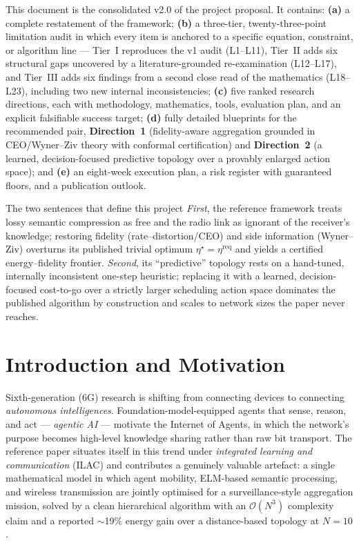 \documentclass[11pt,a4paper]{article}
\newcommand{\Dir}[1]{\textcolor{accent}{\textbf{Direction~#1}}}
\begin{document}
This document is the consolidated v2.0 of the project proposal. It contains: \textbf{(a)} a complete restatement of the framework; \textbf{(b)} a three-tier, twenty-three-point limitation audit in which every item is anchored to a specific equation, constraint, or algorithm line --- Tier~I reproduces the v1 audit (L1--L11), Tier~II adds six structural gaps uncovered by a literature-grounded re-examination (L12--L17), and Tier~III adds six findings from a second close read of the mathematics (L18--L23), including two new internal inconsistencies; \textbf{(c)} five ranked research directions, each with methodology, mathematics, tools, evaluation plan, and an explicit falsifiable success target; \textbf{(d)} fully detailed blueprints for the recommended pair, \Dir{1} (fidelity-aware aggregation grounded in CEO/Wyner--Ziv theory with conformal certification) and \Dir{2} (a learned, decision-focused predictive topology over a provably enlarged action space); and \textbf{(e)} an eight-week execution plan, a risk register with guaranteed floors, and a publication outlook.

\begin{infobox}{The two sentences that define this project}
\emph{First}, the reference framework treats lossy semantic compression as free and the radio link as ignorant of the receiver's knowledge; restoring fidelity (rate--distortion/CEO) and side information (Wyner--Ziv) overturns its published trivial optimum $\eta^{\star}=\eta^{\mathrm{req}}$ and yields a certified energy--fidelity frontier. \emph{Second}, its ``predictive'' topology rests on a hand-tuned, internally inconsistent one-step heuristic; replacing it with a learned, decision-focused cost-to-go over a strictly larger scheduling action space dominates the published algorithm by construction and scales to network sizes the paper never reaches.
\end{infobox}

\clearpage
\tableofcontents
\clearpage

\section{Introduction and Motivation}

Sixth-generation (6G) research is shifting from connecting devices to connecting \emph{autonomous intelligences}. Foundation-model-equipped agents that sense, reason, and act --- \emph{agentic AI} --- motivate the Internet of Agents, in which the network's purpose becomes high-level knowledge sharing rather than raw bit transport. The reference paper situates itself in this trend under \emph{integrated learning and communication} (ILAC) and contributes a genuinely valuable artefact: a single mathematical model in which agent mobility, ELM-based semantic processing, and wireless transmission are jointly optimised for a surveillance-style aggregation mission, solved by a clean hierarchical algorithm with an $\mathcal{O}(N^{3})$ complexity claim and a reported $\sim$19\% energy gain over a distance-based topology at $N{=}10$.
\end{document}
